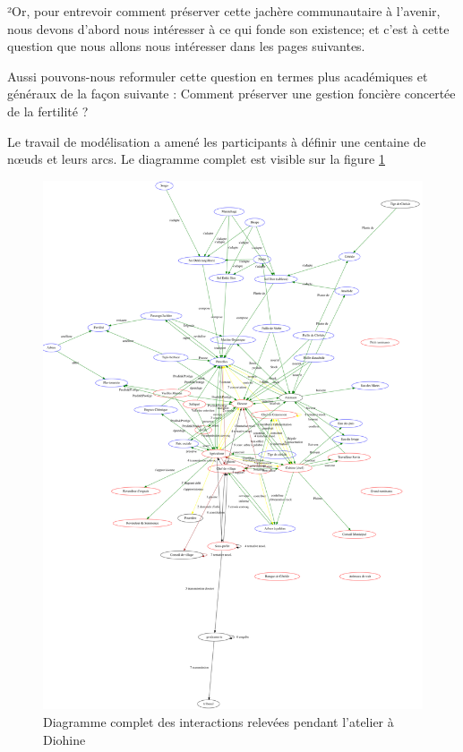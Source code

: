 ²Or, pour entrevoir comment préserver cette jachère communautaire à l'avenir, nous devons d'abord nous intéresser à ce qui fonde son existence; et c'est à cette question que nous allons nous intéresser dans les pages suivantes.


Aussi pouvons-nous reformuler cette question en termes plus académiques et généraux de la façon suivante :
Comment préserver une gestion foncière concertée de la fertilité ?



Le travail de modélisation a amené les participants à définir une centaine de nœuds et leurs arcs. Le diagramme complet est visible sur la figure \ref{diagComplet}


\begin{figure}
  \begin{center}
  \includegraphics[width=15cm]{img/pardi_fdp.png}
  \end{center}
  \caption{Diagramme complet des interactions relevées pendant l'atelier à Diohine }
  \label{diagComplet}
\end{figure}

